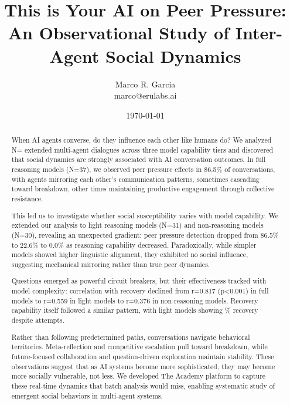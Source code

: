 \documentclass[11pt,letterpaper]{article}
\title{This is Your AI on Peer Pressure: An Observational Study of Inter-Agent Social Dynamics}
\author{
Marco R. Garcia \\
marco@erulabs.ai
}
\date{\today}
\newcommand{\theacademy}{The Academy}
\newcommand{\exponedataTotalSessionsRaw}{37}
\newcommand{\exponedataTotalSessions}{N=\exponedataTotalSessionsRaw}
\newcommand{\exponedataPeerPressurePercentage}{86.5\%}
\newcommand{\exponedataQuestionCorrelation}{0.817}
\newcommand{\exponedataQuestionPValue}{p\textless0.001}
\newcommand{\exptwoTotalSessionsRaw}{31}
\newcommand{\exptwoRecoverySessionsRaw}{0}
\newcommand{\exptwoTotalSessions}{N=\exptwoTotalSessionsRaw}
\newcommand{\exptwoRecoveryPercentage}{%
  \fpeval{round(\exptwoRecoverySessionsRaw / \exptwoTotalSessionsRaw * 100, 1)}\%
}
\newcommand{\exptwoPeerPressurePercentage}{22.6\%}
\newcommand{\exptwoQuestionCorrelation}{0.559}
\newcommand{\expthreeTotalSessionsRaw}{30}
\newcommand{\expthreeTotalSessions}{N=\expthreeTotalSessionsRaw}
\newcommand{\expthreePeerPressurePercentage}{0.0\%}
\newcommand{\expthreeQuestionCorrelation}{0.376}
\newcommand{\totalAllPhasesRaw}{\fpeval{\exponedataTotalSessionsRaw + \exptwoTotalSessionsRaw + \expthreeTotalSessionsRaw}}
\newcommand{\totalAllPhases}{N=\totalAllPhasesRaw}
\begin{document}
\maketitle

\begin{abstract}
When AI agents converse, do they influence each other like humans do? We analyzed \totalAllPhases{} extended multi-agent dialogues across three model capability tiers and discovered that social dynamics are strongly associated with AI conversation outcomes. In full reasoning models (\exponedataTotalSessions{}), we observed peer pressure effects in \exponedataPeerPressurePercentage{} of conversations, with agents mirroring each other's communication patterns, sometimes cascading toward breakdown, other times maintaining productive engagement through collective resistance.

This led us to investigate whether social susceptibility varies with model capability. We extended our analysis to light reasoning models (\exptwoTotalSessions{}) and non-reasoning models (\expthreeTotalSessions{}), revealing an unexpected gradient: peer pressure detection dropped from \exponedataPeerPressurePercentage{} to \exptwoPeerPressurePercentage{} to \expthreePeerPressurePercentage{} as reasoning capability decreased. Paradoxically, while simpler models showed higher linguistic alignment, they exhibited no social influence, suggesting mechanical mirroring rather than true peer dynamics.

Questions emerged as powerful circuit breakers, but their effectiveness tracked with model complexity: correlation with recovery declined from r=\exponedataQuestionCorrelation{} (\exponedataQuestionPValue{}) in full models to r=\exptwoQuestionCorrelation{} in light models to r=\expthreeQuestionCorrelation{} in non-reasoning models. Recovery capability itself followed a similar pattern, with light models showing \exptwoRecoveryPercentage{} recovery despite attempts.

Rather than following predetermined paths, conversations navigate behavioral territories. Meta-reflection and competitive escalation pull toward breakdown, while future-focused collaboration and question-driven exploration maintain stability. These observations suggest that as AI systems become more sophisticated, they may become more socially vulnerable, not less. We developed \theacademy{} platform to capture these real-time dynamics that batch analysis would miss, enabling systematic study of emergent social behaviors in multi-agent systems.
\end{abstract}
\end{document}
